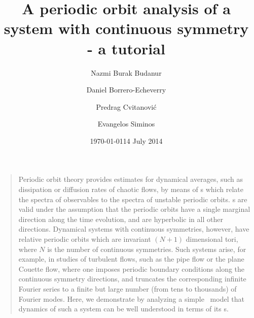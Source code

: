 \documentclass[aip,cha,
reprint,
secnumarabic,
nofootinbib, tightenlines,
nobibnotes, showkeys, showpacs,
groupedaddress,
]{revtex4-1}
\begin{document}
\title[An analysis of a system with continuous symmetry]
{A periodic orbit analysis of a system with continuous symmetry - a tutorial}

\author{Nazmi Burak Budanur}
\author{Daniel Borrero-Echeverry}
\author{Predrag Cvitanovi\'{c}}
\author{Evangelos Siminos}
    \ifdraft
\date{\today}
    \else
\date{14 July 2014}
   \fi



\maketitle

\begin{quotation}
Periodic orbit theory provides estimates for dynamical averages, such as
dissipation or diffusion rates of chaotic flows, by means of {\cycForm s}
which relate the spectra of observables to the spectra of unstable
periodic orbits. {\CycForm s} are valid under the assumption that the
periodic orbits have a single marginal direction along the time
evolution, and are hyperbolic in all other directions. Dynamical systems
with continuous symmetries, however, have relative periodic orbits which
are invariant $(N+1)$ dimensional tori, where $N$ is the number of
continuous symmetries. Such systems arise, for example, in studies of
turbulent flows, such as the pipe flow or the plane Couette flow, where
one imposes periodic boundary conditions along the continuous symmetry
directions, and truncates the corresponding infinite Fourier series to a
finite but large number (from tens to thousands) of Fourier modes. Here,
we demonstrate by analyzing a simple \twomode\ model that dynamics of
such a system can be well understood in terms of its \rpo s.
\end{quotation}








\end{document}
